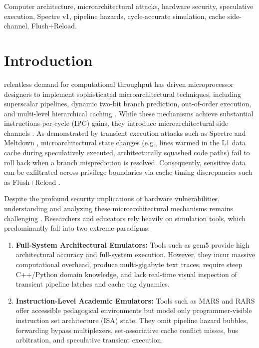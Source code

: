 \documentclass[journal,twocolumn,10pt]{IEEEtran}
\begin{document}
\begin{IEEEkeywords}
Computer architecture, microarchitectural attacks, hardware security, speculative execution, Spectre v1, pipeline hazards, cycle-accurate simulation, cache side-channel, Flush+Reload.
\end{IEEEkeywords}

\section{Introduction}
 relentless demand for computational throughput has driven microprocessor designers to implement sophisticated microarchitectural techniques, including superscalar pipelines, dynamic two-bit branch prediction, out-of-order execution, and multi-level hierarchical caching \cite{hennessy2017, hill2008}. While these mechanisms achieve substantial instructions-per-cycle (IPC) gains, they introduce microarchitectural side channels \cite{ge2021, chandrasekaran2022}. As demonstrated by transient execution attacks such as Spectre \cite{kocher2019} and Meltdown \cite{lipp2018}, microarchitectural state changes (e.g., lines warmed in the L1 data cache during speculatively executed, architecturally squashed code paths) fail to roll back when a branch misprediction is resolved. Consequently, sensitive data can be exfiltrated across privilege boundaries via cache timing discrepancies such as Flush+Reload \cite{yarom2014}.

Despite the profound security implications of hardware vulnerabilities, understanding and analyzing these microarchitectural mechanisms remains challenging \cite{zombieload2019, rowhammer2016}. Researchers and educators rely heavily on simulation tools, which predominantly fall into two extreme paradigms:
\begin{enumerate}
    \item \textbf{Full-System Architectural Emulators:} Tools such as gem5 \cite{binkert2011} provide high architectural accuracy and full-system execution. However, they incur massive computational overhead, produce multi-gigabyte text traces, require steep C++/Python domain knowledge, and lack real-time visual inspection of transient pipeline latches and cache tag dynamics.
    \item \textbf{Instruction-Level Academic Emulators:} Tools such as MARS \cite{vollmar2006} and RARS \cite{rars} offer accessible pedagogical environments but model only programmer-visible instruction set architecture (ISA) state. They omit pipeline hazard bubbles, forwarding bypass multiplexers, set-associative cache conflict misses, bus arbitration, and speculative transient execution.
\end{enumerate}
\end{document}

